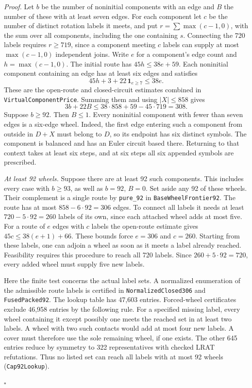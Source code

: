 \documentclass[11pt]{article}
\newenvironment{proof}[1][Proof]{\par\smallskip\noindent\textit{#1.}\enspace}{\unskip\nobreak\hfill\ensuremath{\square}\par\smallskip}
\begin{document}
\begin{proof}
Let $b$ be the number of noninitial components with an edge and $B$ the
number of these with at least seven edges. For each component let $c$ be
the number of distinct rotation labels it meets, and put
$r=\sum\max(c-1,0)$, with the sum over all components, including the one containing $s$. Connecting the 720
labels requires $r\ge719$, since a component meeting $c$ labels can
supply at most $\max(c-1,0)$ independent joins. Write $e$ for a component's edge count and $h=\max(c-1,0)$. The initial route has $45h\le38e+59$. Each noninitial component containing an edge has at least six edges and satisfies
\[
  45h+3+22\,\mathbf1_{e\ge7}\le38e.
\]
These are the open-route and closed-circuit estimates combined in \texttt{VirtualComponentPrice}. Summing them and using $|X|\le858$ gives
\[
  3b+22B\le38\cdot858+59-45\cdot719=308.
\]
Suppose $b\ge92$.
Then $B\le1$. Every noninitial component with fewer than seven edges is a
six-edge wheel. Indeed, the first edge entering such a component from outside in $D+X$ must belong to $D$, so its endpoint has six distinct symbols. The component is balanced and has an Euler circuit based there. Returning to that context takes at least six steps, and at six steps all six appended symbols are prescribed.

\smallskip\noindent\emph{At least 92 wheels.} Suppose there are at least 92 such components. This includes every case with $b\ge93$, as well as $b=92$, $B=0$. Set aside any 92 of these wheels. Their complement is a single route by \texttt{pure\_92} in \texttt{BaseWheelFrontier92}. The route has at most $858-6\cdot92=306$ edges. To connect all labels it needs at least $720-5\cdot92=260$ labels of its own, since each attached wheel adds at most five. For a route of $e$ edges with $c$ labels the open-route estimate gives $45c\le38(e+1)+66$. These bounds force $e=306$ and $c=260$. Starting from these labels,
one can adjoin a wheel as soon as it meets a label already reached.
Feasibility requires this procedure to reach all 720 labels. Since
$260+5\cdot92=720$, every added wheel must supply five new labels.

Here the finite test concerns the actual label sets. A normalized
enumeration of the admissible route labels is certified in \texttt{NormalizedClosed306} and \texttt{FusedPacked92}. The lookup table has 47,603 entries. Forced-wheel certificates exclude 46,958 entries by the following rule. For a specified
missing label, every wheel containing it except possibly one meets the
reached set in at least two labels. A wheel with two such contacts would add at most four new labels. A cover must therefore use the sole remaining wheel, if one exists.
The other 645 entries reduce by symmetry to 322 representatives with
checked LRAT refutations. Thus no listed set can reach all labels with
at most 92 wheels (\texttt{Cap92Lookup}).


\end{proof}
\end{document}
